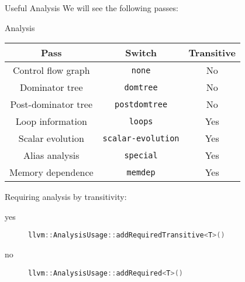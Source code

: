 \documentclass[10pt,mathserif]{beamer}
\newcommand{\cppinline}[1]{\lstinline[language=C++]!#1!}
\begin{document}
\begin{frame}{Useful Analysis}
We will see the following passes:

\begin{block}{Analysis}
\centering
\begin{tabular}{ccc}
\toprule

\multicolumn{1}{c}{\textbf{Pass}}        &
\multicolumn{1}{c}{\textbf{Switch}}      &
\multicolumn{1}{c}{\textbf{Transitive}} \\

\midrule

Control flow graph  &
\texttt{none}       &
No                 \\

Dominator tree    &
\texttt{domtree}  &
No               \\

Post-dominator tree   &
\texttt{postdomtree}  &
No                   \\

Loop information  &
\texttt{loops}    &
Yes              \\

Scalar evolution           &
\texttt{scalar-evolution}  &
Yes                       \\

Alias analysis    &
\texttt{special}  &
Yes              \\

Memory dependence  &
\texttt{memdep}    &
Yes               \\

\bottomrule
\end{tabular}
\end{block}

Requiring analysis by transitivity:

\begin{description}
\item[yes] \cppinline{llvm::AnalysisUsage::addRequiredTransitive<T>()}
\item[no] \cppinline{llvm::AnalysisUsage::addRequired<T>()}
\end{description}
\end{frame}
\end{document}
